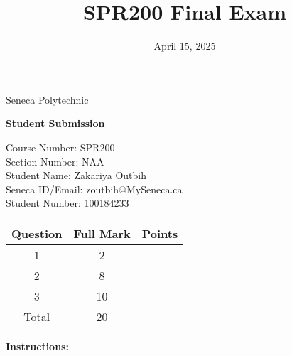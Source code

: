 \documentclass[answer]{exam}  %
\begin{document}
\title{SPR200 Final Exam}
\date{April 15, 2025}


\begin{center}
    \Large
    {\bfseries\makeatletter\@title\makeatother}

    \bigskip

    Seneca Polytechnic

    \makeatletter\@date\makeatother

    \ifanswer
        \vspace{1pc}

        {\sffamily\bfseries Student Submission}

        \vspace{1pc}
    \fi
    
    \vfill

    \begin{center}
        Course Number: SPR200 \\
        Section Number: NAA \\
        Student Name: Zakariya Outbih \\
        Seneca ID/Email: zoutbih@MySeneca.ca \\
        Student Number: 100184233
    \end{center}

    \vfill


    \ifanswer
        \normalsize
        \begin{tabular}{| c | c | c |}
            \hline
            Question & Full Mark & \bfseries Points \\
            \hline\hline
             1 & 2 & \\ \hline
             2 & 8  &\\ \hline
             3 & 10  &\\ \hline         
            Total & 20  &\\
            \hline
        \end{tabular}
    \fi

\end{center}

\ifanswer\else

    \vfill

    \textbf{Instructions:}
\end{document}
